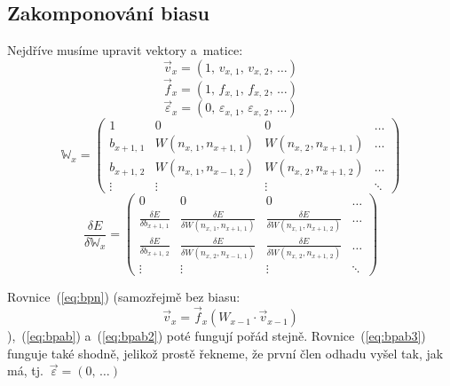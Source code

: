 \documentclass[12pt]{report}			%
\newcommand{\W}{\mathbb{W}}
\begin{document}
					\subsection{Zakomponování biasu}
					Nejdříve musíme upravit vektory a~matice:
					\begin{equation} \vec{v}_x = \left(1,\,v_{x,\,1},\,v_{x,\,2},\,\ldots\right) \end{equation}
					\begin{equation} \vec{f}_x = \left(1,\,f_{x,\,1},\,f_{x,\,2},\,\ldots\right) \end{equation}
					\begin{equation} \vec{\varepsilon}_x = \left(0,\,\varepsilon_{x,\,1},\,\varepsilon_{x,\,2},\,\ldots\right) \end{equation}
					\begin{equation}
						\W_x = \begin{pmatrix}
							1 & 0 & 0 & \ldots \\
							b_{x+1,\,1} & W\left(n_{x,\,1}, n_{x+1,\,1}\right) & W\left(n_{x,\,2}, n_{x+1,\,1}\right) & \ldots \\
							b_{x+1,\,2} & W\left(n_{x,\,1}, n_{x-1,\,2}\right) & W\left(n_{x,\,2}, n_{x+1,\,2}\right) & \ldots \\
							\vdots & \vdots & \vdots & \ddots
						\end{pmatrix}
					\end{equation}
					\begin{equation}
						\frac{\delta E}{\delta \W_x} = \begin{pmatrix}
							0 & 0 & 0 & \ldots \\
							\frac{\delta E}{\delta b_{x+1,\,1}} & \frac{\delta E}{\delta W\left(n_{x,\,1}, n_{x+1,\,1}\right)} & \frac{\delta E}{\delta W\left(n_{x,\,1}, n_{x+1,\,2}\right)} & \ldots \\
							\frac{\delta E}{\delta b_{x+1,\,2}} & \frac{\delta E}{\delta W\left(n_{x,\,2}, n_{x-1,\,1}\right)} & \frac{\delta E}{\delta W\left(n_{x,\,2}, n_{x+1,\,2}\right)} & \ldots \\
							\vdots & \vdots & \vdots & \ddots
						\end{pmatrix}
					\end{equation}
					
					Rovnice~(\ref{eq:bpn}) (samozřejmě bez biasu:
					\begin{equation} \vec{v}_x = \vec{f}_x\left(W_{x-1} \cdot \vec{v}_{x-1} \right) \label{eq:bpnb} \end{equation}
					),~(\ref{eq:bpab}) a~(\ref{eq:bpab2}) poté fungují pořád stejně. Rovnice~(\ref{eq:bpab3}) funguje také shodně, jelikož prostě řekneme, že první člen odhadu vyšel tak, jak má, tj.~$\vec{\varepsilon} = \left(0,\,\ldots\right)$
				
\end{document}
